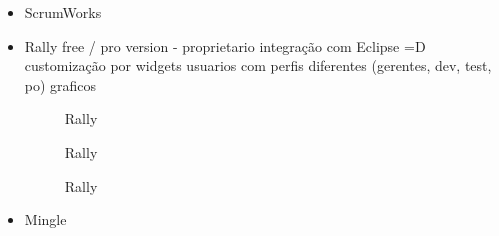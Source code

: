 \begin{itemize}
\item ScrumWorks

\item Rally
free / pro version - proprietario
integração com Eclipse =D
customização por widgets
usuarios com perfis diferentes (gerentes, dev, test, po)
graficos

\begin{figure}[htbp]
  \centering
  \caption{Rally}
\end{figure}

\begin{figure}[htbp]
  \centering
  \caption{Rally}
\end{figure}

\begin{figure}[htbp]
  \centering
  \caption{Rally}
\end{figure}

\item Mingle

\end{itemize}

